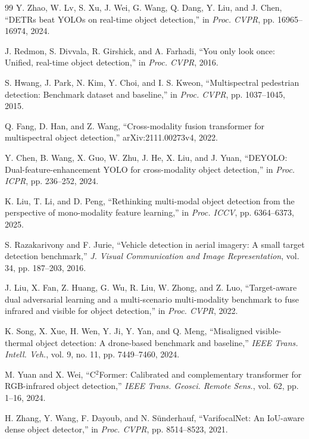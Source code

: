 \documentclass[letterpaper,journal]{IEEEtran}
\begin{document}
\begin{thebibliography}{99}
Y. Zhao, W. Lv, S. Xu, J. Wei, G. Wang, Q. Dang, Y. Liu, and J. Chen, ``DETRs beat YOLOs on real-time object detection,'' in \emph{Proc. CVPR}, pp. 16965--16974, 2024.


J. Redmon, S. Divvala, R. Girshick, and A. Farhadi, ``You only look once: Unified, real-time object detection,'' in \emph{Proc. CVPR}, 2016.


S. Hwang, J. Park, N. Kim, Y. Choi, and I. S. Kweon, ``Multispectral pedestrian detection: Benchmark dataset and baseline,'' in \emph{Proc. CVPR}, pp. 1037--1045, 2015.


Q. Fang, D. Han, and Z. Wang, ``Cross-modality fusion transformer for multispectral object detection,'' arXiv:2111.00273v4, 2022.


Y. Chen, B. Wang, X. Guo, W. Zhu, J. He, X. Liu, and J. Yuan, ``DEYOLO: Dual-feature-enhancement YOLO for cross-modality object detection,'' in \emph{Proc. ICPR}, pp. 236--252, 2024.


K. Liu, T. Li, and D. Peng, ``Rethinking multi-modal object detection from the perspective of mono-modality feature learning,'' in \emph{Proc. ICCV}, pp. 6364--6373, 2025.


S. Razakarivony and F. Jurie, ``Vehicle detection in aerial imagery: A small target detection benchmark,'' \emph{J. Visual Communication and Image Representation}, vol. 34, pp. 187--203, 2016.


J. Liu, X. Fan, Z. Huang, G. Wu, R. Liu, W. Zhong, and Z. Luo, ``Target-aware dual adversarial learning and a multi-scenario multi-modality benchmark to fuse infrared and visible for object detection,'' in \emph{Proc. CVPR}, 2022.


K. Song, X. Xue, H. Wen, Y. Ji, Y. Yan, and Q. Meng, ``Misaligned visible-thermal object detection: A drone-based benchmark and baseline,'' \emph{IEEE Trans. Intell. Veh.}, vol. 9, no. 11, pp. 7449--7460, 2024.


M. Yuan and X. Wei, ``C$^2$Former: Calibrated and complementary transformer for RGB-infrared object detection,'' \emph{IEEE Trans. Geosci. Remote Sens.}, vol. 62, pp. 1--16, 2024.


H. Zhang, Y. Wang, F. Dayoub, and N. S\"underhauf, ``VarifocalNet: An IoU-aware dense object detector,'' in \emph{Proc. CVPR}, pp. 8514--8523, 2021.



\end{thebibliography}
\end{document}
